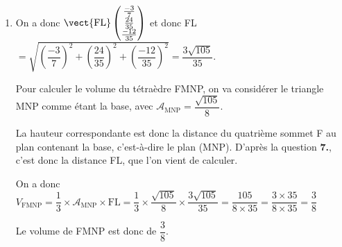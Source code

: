 \begin{enumerate}
Le point de paramètre $\dfrac{-3}{35}$ sur $d$ a pour coordonnées : $\left(1 + 5\times \dfrac{-3}{35}~;~-8\times \dfrac{-3}{35}~;~1 + 4\times \dfrac{-3}{35}\right) $, c'est donc bien le point L, de coordonnées  L$\left(\dfrac47~~;~~\dfrac{24}{35}~~;~~\dfrac{23}{35}\right)$.

\item On a donc $\vect{\mathrm{FL}}\begin{pmatrix} \frac{-3}7\\ \frac{24}{35}\\ \frac{-12}{35}	\end{pmatrix}$ et donc FL $= \sqrt{\left(\dfrac{-3}{7}\right)^2 + \left(\dfrac{24}{35}\right)^2 + \left(\dfrac{-12}{35}\right)^2 } = \dfrac{3\sqrt{105}}{35}$.

Pour calculer le volume du tétraèdre FMNP, on va considérer le triangle MNP comme étant la base, avec $\mathcal{A}_{\mathrm{MNP}} =\dfrac{\sqrt{105}}{8} $.

La hauteur correspondante est donc la distance du quatrième sommet F au plan contenant la base, c'est-à-dire le plan (MNP). D'après la question \textbf{7.}, c'est donc la distance FL, que l'on vient de calculer.

On a donc $ V_{\mathrm{FMNP}} = \dfrac{1}{3} \times \mathcal{A}_{\mathrm{MNP}} \times \mathrm{FL} = \dfrac{1}{3}\times \dfrac{\sqrt{105}}{8} \times \dfrac{3\sqrt{105}}{35} = \dfrac{105}{8\times 35} = \dfrac{3\times 35}{8\times 35 } = \dfrac{3}{8}$

Le volume de FMNP est donc de $\dfrac{3}{8}$.
\end{enumerate}

\medskip
